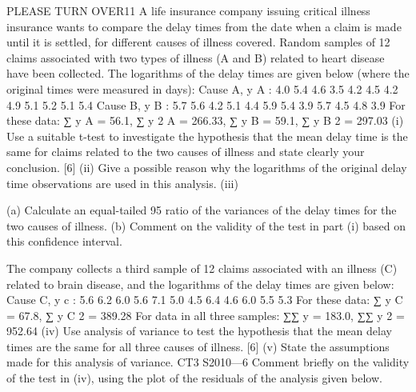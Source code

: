 \documentclass[a4paper,12pt]{article}
\begin{document}
\begin{enumerate}
PLEASE TURN OVER11
A life insurance company issuing critical illness insurance wants to compare the delay
times from the date when a claim is made until it is settled, for different causes of
illness covered. Random samples of 12 claims associated with two types of illness (A
and B) related to heart disease have been collected. The logarithms of the delay times
are given below (where the original times were measured in days):
Cause A, y A : 4.0 5.4 4.6 3.5 4.2 4.5 4.2 4.9 5.1 5.2 5.1 5.4
Cause B, y B : 5.7 5.6 4.2 5.1 4.4 5.9 5.4 3.9 5.7 4.5 4.8 3.9
For these data:
∑ y A = 56.1, ∑ y 2 A = 266.33,
∑ y B = 59.1, ∑ y B 2 = 297.03
(i) Use a suitable t-test to investigate the hypothesis that the mean delay time is
the same for claims related to the two causes of illness and state clearly your
conclusion.
[6]
(ii) Give a possible reason why the logarithms of the original delay time
observations are used in this analysis.
(iii)

(a) Calculate an equal-tailed 95%
ratio of the variances of the delay times for the two causes of illness.
(b) Comment on the validity of the test in part (i) based on this confidence
interval.

The company collects a third sample of 12 claims associated with an illness (C)
related to brain disease, and the logarithms of the delay times are given below:
Cause C, y c : 5.6 6.2 6.0 5.6 7.1 5.0 4.5 6.4 4.6 6.0 5.5 5.3
For these data:
∑ y C = 67.8, ∑ y C 2 = 389.28
For data in all three samples:
∑∑ y = 183.0, ∑∑ y 2 = 952.64
(iv) Use analysis of variance to test the hypothesis that the mean delay times are
the same for all three causes of illness.
[6]
(v) State the assumptions made for this analysis of variance.
CT3 S2010—6
Comment briefly on the validity of the test in (iv), using the plot of the
residuals of the analysis given below.


\end{enumerate}
\end{document}
